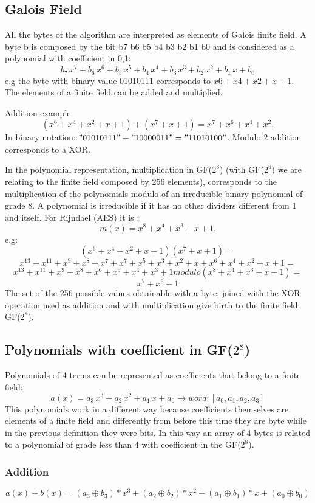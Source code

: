 \documentclass{article}
\begin{document}
\subsection{Galois Field}
All the bytes of the algorithm are interpreted as elements of Galois finite field.
A byte b is composed by the bit b7 b6 b5 b4 b3 b2 b1 b0 and is considered as a polynomial with coefficient in {0,1}:
\[ b_7\,x^7 +  b_6\,x^6 +  b_5\,x^5+ b_4\,x^4+ b_3\,x^3+ b_2\,x^2+ b_1\,x + b_0\]
e.g the byte with binary value 01010111 corresponds to $x6+ x4+ x2+ x + 1.$
The elements of a finite field can be added and multiplied. 

Addition example:
\[(x^6+ x^4 + x^2+ x + 1) + (x^7+ x + 1) = x^7+ x^6+ x^4+ x^2.\]
In binary notation: $"01010111" + "10000011" = "11010100"$.
Modulo 2 addition corresponds to a XOR.

In the polynomial representation, multiplication in GF($2^8$) (with GF($2^8$) we are relating to the finite field composed by 256 elements), corresponds to the multiplication of the polynomials modulo of an irreducible binary polynomial of grade 8. A polynomial is irreducible if it has no other dividers different from 1 and itself. 
For Rijndael (AES) it is :
\[m (x) = x^8+ x^4 + x^3 + x + 1.\]
e.g:
\[(x^6+ x^4+ x^2+ x + 1) (x^7+ x + 1)=\]
\[x^{13}+ x^{11}+ x^9+ x^8+ x^7+x^7+ x^5+ x^3+ x^2+ x +x^6+ x^4+ x^2+ x + 1=\] 
\[x^{13}+ x^{11}+ x^9+ x^8+ x^6+ x^5+ x^4+ x^3+ 1  modulo(x^8+ x^4+ x^3+ x + 1)=\]
\[ x^7+ x^6+ 1\]
The set of the 256 possible values obtainable with a byte, joined with the XOR operation used as addition and with multiplication give birth to the finite field GF($2^8$).
\subsection{Polynomials with coefficient in GF($2^8$)}
\label{sec:polyGF}
Polynomials of 4 terms can be represented as coefficients that belong to a finite field:
\[a(x) = a_3\,x^3 + a_2\,x^2+ a_1\,x + a_0 \rightarrow word: [a_0, a_1, a_2, a_3]\]
This polynomials work in a different way because coefficients themselves are elements of a finite field and differently from before this time they are byte while in the previous definition they were bits. In this way an array of  4 bytes is related to a polynomial of grade less than 4 with coefficient in the GF($2^8$).
\subsubsection{Addition}
\[a(x) + b(x) = (a_3\oplus b_3 )*x^3 + (a_2\oplus b_2 )*x^2 + (a_1\oplus b_1 )*x + (a_0\oplus b_0 )\]
\end{document}
